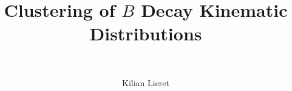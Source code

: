 %
\title%
	{
		\texorpdfstring%
			{Clustering of $B$ Decay Kinematic Distributions}%
			{Clustering of B Decay Kinematic Distributions}%
	}
%
\subtitle{\ \relax}
\author{Kilian Lieret}
\newcommand*{\coauthors}{}
%
%